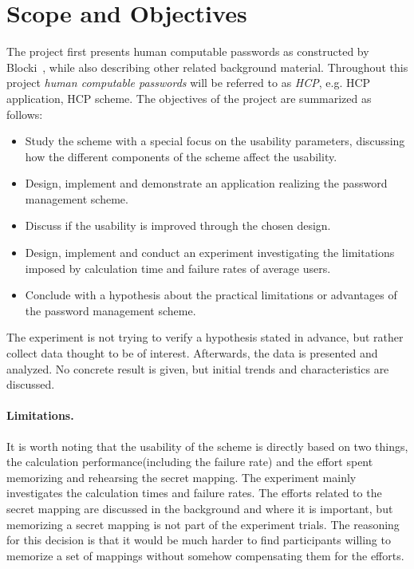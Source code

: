 
\section{Scope and Objectives}
The project first presents human computable passwords as constructed by Blocki~\cite{hcp-blocki}, while also describing other related background material. Throughout this project \emph{human computable passwords} will be referred to as \emph{HCP}, e.g. HCP application, HCP scheme. The objectives of the project are summarized as follows:
\begin{itemize}
    \item Study the scheme with a special focus on the usability parameters, discussing how the different components of the scheme affect the usability.
    \item Design, implement and demonstrate an application realizing the password management scheme.
    \item Discuss if the usability is improved through the chosen design. 
    \item Design, implement and conduct an experiment investigating the limitations imposed by calculation time and failure rates of average users.
    \item Conclude with a hypothesis about the practical limitations or advantages of the password management scheme.
\end{itemize}
\par The experiment is not trying to verify a hypothesis stated in advance, but rather collect data thought to be of interest. Afterwards, the data is presented and analyzed. No concrete result is given, but initial trends and characteristics are discussed.
\paragraph{Limitations.}
It is worth noting that the usability of the scheme is directly based on two things, the calculation performance(including the failure rate) and the effort spent memorizing and rehearsing the secret mapping. The experiment mainly investigates the calculation times and failure rates. The efforts related to the secret mapping are discussed in the background and where it is important, but memorizing a secret mapping is not part of the experiment trials. The reasoning for this decision is that it would be much harder to find participants willing to memorize a set of mappings without somehow compensating them for the efforts.



